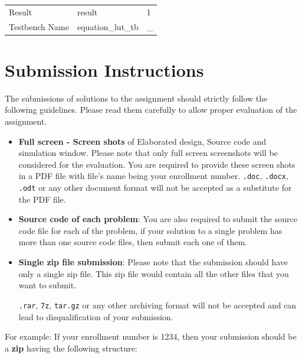 \documentclass[a4paper,10pt]{article}
\newcommand{\ano}{\text{2}}
\theoremstyle{mytheor}
\newcommand{\inlinev}[1]{\lstinline[style=verilog-inline-style]{#1}}
\begin{document}
{\begin{table}[!h]
\begin{tabularx}{0.8\textwidth}{|X|X|X|}
       Result          & result            &  1  \\
       
       Testbench Name  & equation\_lut\_tb & \_ \\
       \hline
     \end{tabularx}
   \end{table}

 }
 

 \section*{Submission Instructions}
The submissions of solutions to the assignment {\ano} should strictly
follow the following guidelines. Please read them carefully to allow
proper evaluation of the assignment.

\begin{itemize}
\item \textbf{Full screen - Screen shots} of Elaborated design, Source
  code and simulation window. Please note that only full screen
  screenshots will be considered for the evaluation. You are required
  to provide these screen shots in a PDF file with file's name being
  your enrollment
  number. \inlinev{.doc},
  \inlinev{.docx},
  \inlinev{.odt} or any other document
  format will {\color{red}not} be accepted as a substitute for the PDF
  file.

\item \textbf{Source code of each problem}: You are also required to submit
the source code file for each of the problem, if your solution to a
single problem has more than one source code files, then submit each
one of them.

\item \textbf{Single zip file submission}: Please note that the
  submission should have only a single {\color{blue}zip} file. This
  zip file would contain all the other files that you want to submit.

  \inlinev{.rar},
  \inlinev{7z},
  \inlinev{tar.gz} or any other
  archiving format will {\color{red}not} be accepted and can lead to
  disqualification of your submission.
  
\end{itemize} 

{\color{blue}For example}: If your enrollment number is 1234, then your
submission should be a \textbf{\color{blue}zip} having the following
structure:
\end{document}
